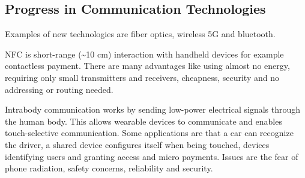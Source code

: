 \subsection{Progress in Communication Technologies}
\begin{mytitle} Examples of new technologies are fiber optics, wireless 5G and bluetooth.
\end{mytitle}
\begin{mytitle} NFC is short-range (\textasciitilde 10 cm) interaction with handheld devices for example contactless payment. There are many advantages like using almost no energy, requiring only small transmitters and receivers, cheapness, security and no addressing or routing needed.
\end{mytitle}
\begin{mytitle} Intrabody communication works by sending low-power electrical signals through the human body. This allows wearable devices to communicate and enables touch-selective communication. Some applications are that a car can recognize the driver, a shared device configures itself when being touched, devices identifying users and granting access and micro payments. Issues are the fear of phone radiation, safety concerns, reliability and security.
\end{mytitle}


